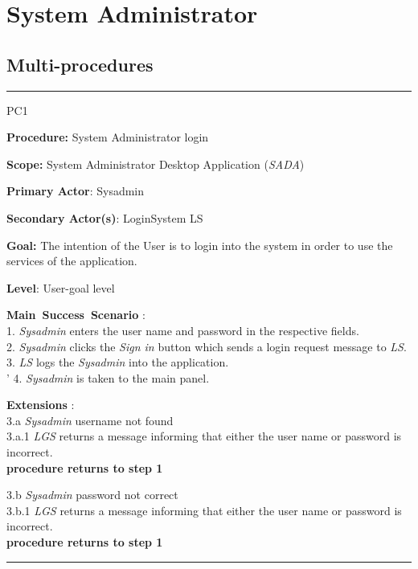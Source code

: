\section{System Administrator}
\label{chap:usage_guide}

\subsection{Multi-procedures}

\vspace{0.5cm}
\hrule
\begin{lyxlist}{PC1}
\small{
\item [\textbf{Procedure:}] System Administrator login
\item [\textbf{Scope:}] System Administrator Desktop Application (\emph{SADA})
\item [\textbf{Primary Actor}:] Sysadmin
\item [\textbf{Secondary Actor(s)}:] LoginSystem LS
\item [\textbf{Goal:}] The intention of the User is to login into the system in
order to use the services of the application.
\item [\textbf{Level}:] User-goal level
\item [\textbf{Main~Success~Scenario}]:\\
1. \emph{Sysadmin} enters the user name and password in the respective
fields.\\
2. \emph{Sysadmin} clicks the \emph{Sign in} button which sends a login
request message to \emph{LS}.\\
3. \emph{LS} logs the \emph{Sysadmin} into the application.\\'
4. \emph{Sysadmin} is taken to the main panel. \\


\item [\textbf{Extensions}]:\\
3.a \emph{Sysadmin} username not found\\
\hspace*{0.5cm} 3.a.1 \emph{LGS} returns a message informing that either the
user name or password is incorrect. \\
\hspace*{0.5cm} \textbf{procedure returns to step 1}

3.b \emph{Sysadmin} password not correct \\
\hspace*{0.5cm} 3.b.1 \emph{LGS} returns a message informing that either the
user name or password is incorrect. \\
\hspace*{0.5cm} \textbf{procedure returns to step 1}

}

\end{lyxlist}
\hrule

